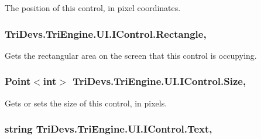 The position of this control, in pixel coordinates. 

\hypertarget{interface_tri_devs_1_1_tri_engine_1_1_u_i_1_1_i_control_a0aa8012b7ace9f60f2d41675b3f465fe}{
\subsubsection[{Rectangle}]{ Tri\-Devs.\-Tri\-Engine.\-U\-I.\-I\-Control.\-Rectangle\hspace{0.3cm}{\ttfamily [get]}, {\ttfamily [set]}}}\label{interface_tri_devs_1_1_tri_engine_1_1_u_i_1_1_i_control_a0aa8012b7ace9f60f2d41675b3f465fe}


Gets the rectangular area on the screen that this control is occupying. 

\hypertarget{interface_tri_devs_1_1_tri_engine_1_1_u_i_1_1_i_control_ab08f4a027d60ab8a0ba7990b2a0b5d9e}{
\subsubsection[{Size}]{\setlength{\rightskip}{0pt plus 5cm}Point$<$int$>$ Tri\-Devs.\-Tri\-Engine.\-U\-I.\-I\-Control.\-Size\hspace{0.3cm}{\ttfamily [get]}, {\ttfamily [set]}}}\label{interface_tri_devs_1_1_tri_engine_1_1_u_i_1_1_i_control_ab08f4a027d60ab8a0ba7990b2a0b5d9e}


Gets or sets the size of this control, in pixels. 

\hypertarget{interface_tri_devs_1_1_tri_engine_1_1_u_i_1_1_i_control_a6994402c19fa0492129aa032d49a77ee}{
\subsubsection[{Text}]{\setlength{\rightskip}{0pt plus 5cm}string Tri\-Devs.\-Tri\-Engine.\-U\-I.\-I\-Control.\-Text\hspace{0.3cm}{\ttfamily [get]}, {\ttfamily [set]}}}\label{interface_tri_devs_1_1_tri_engine_1_1_u_i_1_1_i_control_a6994402c19fa0492129aa032d49a77ee}


